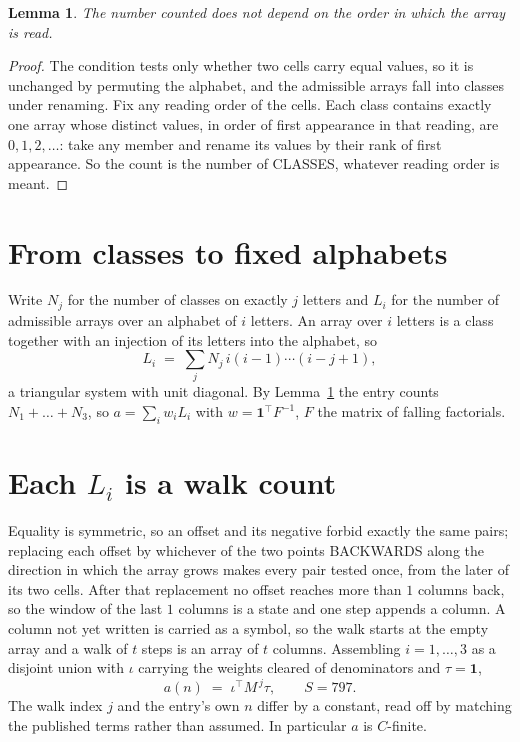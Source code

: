 \documentclass[11pt,a4paper]{article}
\theoremstyle{plain}
\newtheorem{lemma}[theorem]{Lemma}
\theoremstyle{definition}
\begin{document}
\begin{lemma}\label{lem:order}
The number counted does not depend on the order in which the array is read.
\end{lemma}

\begin{proof}
The condition tests only whether two cells carry equal values, so it is unchanged by permuting
the alphabet, and the admissible arrays fall into classes under renaming. Fix any reading order
of the cells. Each class contains exactly one array whose distinct values, in order of first
appearance in that reading, are $0,1,2,\dots$: take any member and rename its values by their
rank of first appearance. So the count is the number of CLASSES, whatever reading order is
meant.
\end{proof}

\section{From classes to fixed alphabets}

Write $N_j$ for the number of classes on exactly $j$ letters and $L_i$ for the number of
admissible arrays over an alphabet of $i$ letters. An array over $i$ letters is a class together
with an injection of its letters into the alphabet, so
\[
L_i\;=\;\sum_j N_j\,i(i-1)\cdots(i-j+1),
\]
a triangular system with unit diagonal. By Lemma~\ref{lem:order} the entry counts
$N_1+\dots+N_{3}$, so $a=\sum_i w_iL_i$ with $w=\mathbf{1}^{\!\top}F^{-1}$, $F$ the
matrix of falling factorials.

\section{Each $L_i$ is a walk count}

Equality is symmetric, so an offset and its negative forbid exactly the same pairs; replacing
each offset by whichever of the two points BACKWARDS along the direction in which the array
grows makes every pair tested once, from the later of its two cells. After that replacement no
offset reaches more than $1$ columns back, so the window of the last $1$
columns is a state and one step appends a column. A column not yet written is
carried as a symbol, so the walk starts at the empty array and a walk of $t$ steps is an array
of $t$ columns. Assembling $i=1,\dots,3$ as a disjoint union with $\iota$ carrying the
weights cleared of denominators and $\tau=\mathbf{1}$,
\[
a(n)\;=\;\iota^{\!\top}M^{\,j}\tau ,\qquad S=797.
\]
The walk index $j$ and the entry's own $n$ differ by a constant, read off by matching the
published terms rather than assumed. In particular $a$ is $C$-finite.
\end{document}
